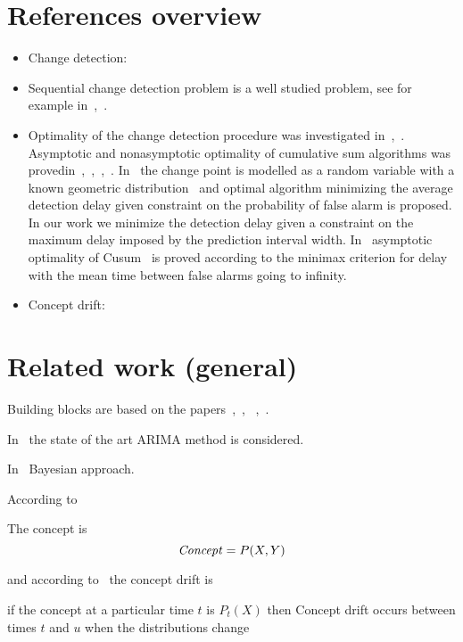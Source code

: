 \section{References overview}
\begin{itemize}
  \item Change detection:~\cite{basseville1993detection}
  \item Sequential change detection problem is a well studied problem, see for example in~\cite{tartakovsky2014sequential},~\cite{plasse2021streaming}.
  \item Optimality of the change detection procedure was investigated in~\cite{Page1954},~\cite{Shiryaev2010,Shiryaev1961,Shiryaev1963}.
  Asymptotic and nonasymptotic optimality of cumulative sum algorithms was provedin~\cite{lorden1971procedures},~\cite{moustakides1986optimal},~\cite{moustakides2004optimality},~\cite{ritov1990decision}. In~\cite{Shiryaev1963,shiryaev2007optimal} the change point is modelled as a random variable with a known geometric distribution~\cite{veeravalli2014quickest} and optimal algorithm minimizing the average detection delay given constraint on the probability of false alarm is proposed. In our work we minimize the detection delay given a constraint on the maximum delay imposed by the prediction interval width. In~\cite{lorden1971procedures} asymptotic optimality of Cusum~\cite{Page1954} is proved according to the minimax criterion for delay with the mean time between false alarms going to infinity.
  \item Concept drift:
\end{itemize}

\section{Related work (general)}
Building blocks are based on the papers~\cite{mackay2007},~\cite{Chapados2014},~\cite{Rasmussen2010} ,~\cite{MacKay_Inference_Book}.

In~\cite{Box_Jenkins_Arima} the state of the art ARIMA method is considered.

In~\cite{mackay2007} Bayesian approach.

According to~\cite{GamaAsurveyOnConceptDrift} 
\begin{definition}
   The concept is
   \begin{equation}
   \text{\textit{Concept}} = P(X,Y)
   \end{equation}    
\end{definition}
and according to~\cite{WebbConceptDrift} the concept drift is
\begin{definition}
   if the concept at a particular time $t$ is $P_t(X)$ then Concept drift occurs between times $t$ and $u$ when the distributions change
   \label{def:concept_drift}    
\end{definition}

